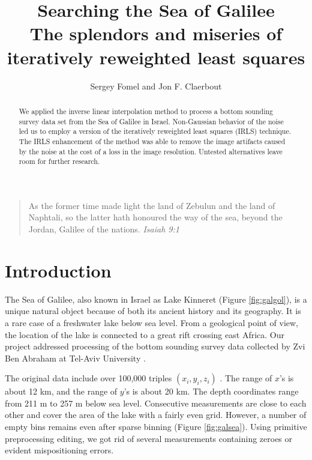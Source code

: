   

\title{Searching the Sea of Galilee \\ 
\normalsize \bf{The splendors and miseries of
iteratively reweighted least squares}}

\author{Sergey Fomel and Jon F. Claerbout}
\maketitle


\begin{quote} As the former time made light the land of Zebulun and
the land of 
Naphtali, so the latter hath honoured the way of the sea, beyond
the Jordan, 
Galilee of the nations. {\em Isaiah 9:1} 
\end{quote} 

\begin{abstract}
We applied the inverse linear interpolation method to pro\-cess a 
bot\-tom sounding survey data set from the Sea of Galilee in Israel.
Non-Gaussian behavior of the noise led us to employ a version of the
iteratively reweighted least squares (IRLS) technique. The IRLS enhancement
of the method was able to remove the image artifacts caused by the
noise at the cost of a loss in the image resolution. Untested
alternatives leave room for further research.
\end{abstract}

\section{Introduction}


The Sea of Galilee, also known in Israel as Lake Kinneret (Figure
\ref{fig:galgol}), is a unique natural 
object because of both its ancient history and its geography. It
is a rare 
case of a freshwater lake below sea level. From a geological point
of view, the location of the lake is connected to a great rift crossing east
Africa. Our project addressed processing of the bottom sounding survey data
collected by Zvi Ben Abraham at Tel-Aviv University .
\par
The original data include over 100,000 triples $(x_i,y_i,z_i)$ . The range of
$x$'s is about 12 km, and the range of $y$'s is about 20 km. 
The depth coordinates
range from 211 m  to 257 m below sea level. 
Consecutive measurements are
close to each other and cover the area of the lake with a fairly even grid.
However, a number of empty bins remains even after sparse binning (Figure
\ref{fig:galsea}). Using primitive preprocessing editing, we got rid of several
measurements containing zeroes or evident mispositioning errors.

